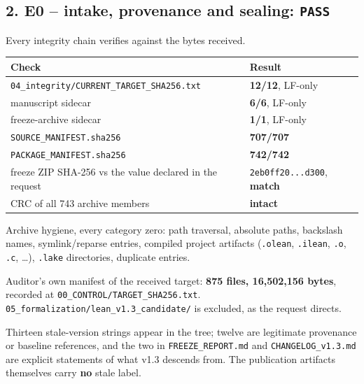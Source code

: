 \documentclass[
  10pt,
]{article}
\newcounter{none} %
\begin{document}
\subsection{\texorpdfstring{2. E0 -- intake, provenance and sealing:
\texttt{PASS}}{2. E0 -- intake, provenance and sealing: PASS}}\label{e0-intake-provenance-and-sealing-pass}

Every integrity chain verifies against the bytes received.

{\def\LTcaptype{none} %
\begin{longtable}[]{@{}
  >{\raggedright\arraybackslash}p{}
  >{\raggedright\arraybackslash}p{}@{}}
\toprule\noalign{}
\begin{minipage}[b]{\linewidth}\raggedright
Check
\end{minipage} & \begin{minipage}[b]{\linewidth}\raggedright
Result
\end{minipage} \\
\midrule\noalign{}
\endhead
\bottomrule\noalign{}
\endlastfoot
\texttt{04\_integrity/CURRENT\_TARGET\_SHA256.txt} & \textbf{12/12},
LF-only \\
manuscript sidecar & \textbf{6/6}, LF-only \\
freeze-archive sidecar & \textbf{1/1}, LF-only \\
\texttt{SOURCE\_MANIFEST.sha256} & \textbf{707/707} \\
\texttt{PACKAGE\_MANIFEST.sha256} & \textbf{742/742} \\
freeze ZIP SHA-256 vs the value declared in the request &
\texttt{2eb0ff20...d300}, \textbf{match} \\
CRC of all 743 archive members & \textbf{intact} \\
\end{longtable}
}

Archive hygiene, every category zero: path traversal, absolute paths,
backslash names, symlink/reparse entries, compiled project artifacts
(\texttt{.olean}, \texttt{.ilean}, \texttt{.o}, \texttt{.c}, \ldots),
\texttt{.lake} directories, duplicate entries.

Auditor's own manifest of the received target: \textbf{875 files,
16,502,156 bytes}, recorded at \texttt{00\_CONTROL/TARGET\_SHA256.txt}.
\texttt{05\_formalization/lean\_v1.3\_candidate/} is excluded, as the
request directs.

Thirteen stale-version strings appear in the tree; twelve are legitimate
provenance or baseline references, and the two in
\texttt{FREEZE\_REPORT.md} and \texttt{CHANGELOG\_v1.3.md} are explicit
statements of what v1.3 descends from. The publication artifacts
themselves carry \textbf{no} stale label.
\end{document}
